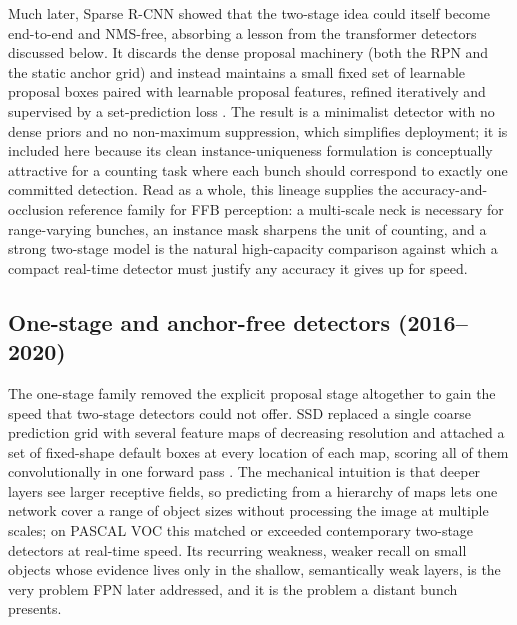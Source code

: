 Much later, Sparse R-CNN showed that the two-stage idea could itself become end-to-end and NMS-free, absorbing a lesson from the transformer detectors discussed below. It discards the dense proposal machinery (both the RPN and the static anchor grid) and instead maintains a small fixed set of learnable proposal boxes paired with learnable proposal features, refined iteratively and supervised by a set-prediction loss \cite{sun2021sparsercnn}. The result is a minimalist detector with no dense priors and no non-maximum suppression, which simplifies deployment; it is included here because its clean instance-uniqueness formulation is conceptually attractive for a counting task where each bunch should correspond to exactly one committed detection. Read as a whole, this lineage supplies the accuracy-and-occlusion reference family for FFB perception: a multi-scale neck is necessary for range-varying bunches, an instance mask sharpens the unit of counting, and a strong two-stage model is the natural high-capacity comparison against which a compact real-time detector must justify any accuracy it gives up for speed.

\subsection{One-stage and anchor-free detectors (2016--2020)}

The one-stage family removed the explicit proposal stage altogether to gain the speed that two-stage detectors could not offer. SSD replaced a single coarse prediction grid with several feature maps of decreasing resolution and attached a set of fixed-shape default boxes at every location of each map, scoring all of them convolutionally in one forward pass \cite{liu2016ssd}. The mechanical intuition is that deeper layers see larger receptive fields, so predicting from a hierarchy of maps lets one network cover a range of object sizes without processing the image at multiple scales; on PASCAL VOC this matched or exceeded contemporary two-stage detectors at real-time speed. Its recurring weakness, weaker recall on small objects whose evidence lives only in the shallow, semantically weak layers, is the very problem FPN later addressed, and it is the problem a distant bunch presents.

